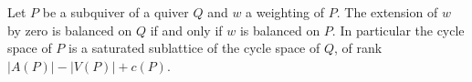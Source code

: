 \begin{theorem}\label{Arden24A-thm-5.1}
\label{Arden24A-thm:subquiver}
Let $P$ be a subquiver of a quiver $Q$ and $w$ a weighting of $P$. The extension of $w$ by zero is balanced on $Q$ if and only if $w$ is balanced on $P$. In particular the cycle space of $P$ is a saturated sublattice of the cycle space of $Q$, of rank $|A(P)| - |V(P)| + c(P)$.
\end{theorem}